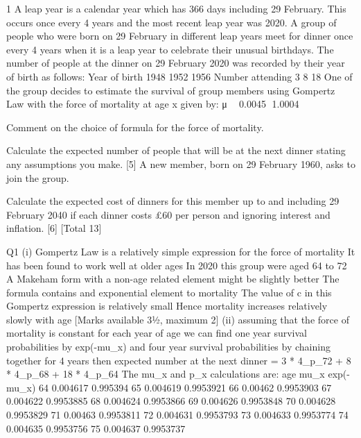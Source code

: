 \documentclass[a4paper,12pt]{article}
\begin{document}

1 A leap year is a calendar year which has 366 days including 29 February. This occurs
once every 4 years and the most recent leap year was 2020. A group of people who
were born on 29 February in different leap years meet for dinner once every 4 years
when it is a leap year to celebrate their unusual birthdays. The number of people at the
dinner on 29 February 2020 was recorded by their year of birth as follows:
Year of birth 1948 1952 1956
Number attending 3 8 18
One of the group decides to estimate the survival of group members using Gompertz
Law with the force of mortality at age x given by:
μ􀯫 􀵌 0.0045 􁈺1.0004􁈻􀯫
\item Comment on the choice of formula for the force of mortality. 
\item Calculate the expected number of people that will be at the next dinner stating
any assumptions you make. [5]
A new member, born on 29 February 1960, asks to join the group.
\item Calculate the expected cost of dinners for this member up to and including
29 February 2040 if each dinner costs £60 per person and ignoring interest
and inflation. [6]
[Total 13]

Q1
(i)
Gompertz Law is a relatively simple expression for the force of mortality 
It has been found to work well at older ages 
In 2020 this group were aged 64 to 72 
A Makeham form with a non-age related element might be slightly better 
The formula contains and exponential element to mortality 
The value of c in this Gompertz expression is relatively small 
Hence mortality increases relatively slowly with age 
[Marks available 3½, maximum 2]
(ii)
assuming that the force of mortality is constant for each year of age 
we can find one year survival probabilities by exp(-mu_x) 
and four year survival probabilities by chaining together for 4 years 
then expected number at the next dinner
= 3 * 4_p_72 + 8 * 4_p_68 + 18 * 4_p_64 
The mu_x and p_x calculations are:
age
mu_x
exp(-mu_x)
64
0.004617
0.995394
65
0.004619
0.9953921
66
0.00462
0.9953903
67
0.004622
0.9953885
68
0.004624
0.9953866
69
0.004626
0.9953848
70
0.004628
0.9953829
71
0.00463
0.9953811
72
0.004631
0.9953793
73
0.004633
0.9953774
74
0.004635
0.9953756
75
0.004637
0.9953737
\end{document}
